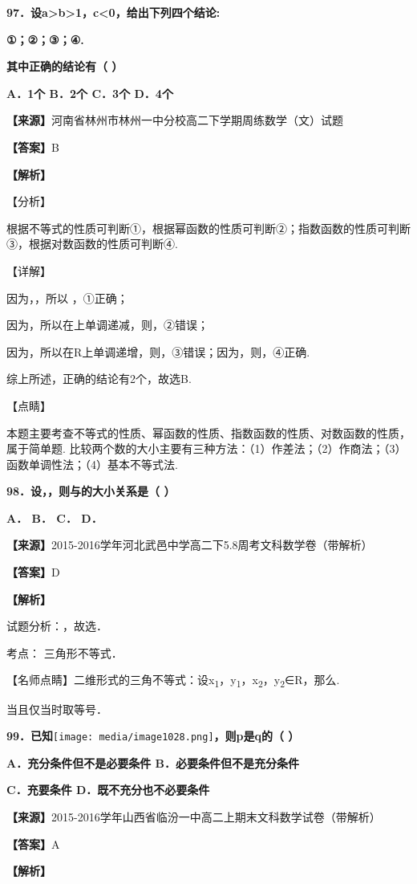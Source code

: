 \textbf{97．设a\textgreater b\textgreater1，c\textless0，给出下列四个结论:}

\textbf{①；②；③；④.}

\textbf{其中正确的结论有（ ）}

\textbf{A．1个 B．2个 C．3个 D．4个}

\textbf{【来源】}河南省林州市林州一中分校高二下学期周练数学（文）试题

\textbf{【答案】}B

\textbf{【解析】}

【分析】

根据不等式的性质可判断①，根据幂函数的性质可判断②；指数函数的性质可判断③，根据对数函数的性质可判断④.

【详解】

因为，，所以 ，①正确；

因为，所以在上单调递减，则，②错误；

因为，所以在R上单调递增，则，③错误；因为，则，④正确.

综上所述，正确的结论有2个，故选B.

【点睛】

本题主要考查不等式的性质、幂函数的性质、指数函数的性质、对数函数的性质，属于简单题.
比较两个数的大小主要有三种方法：（1）作差法；（2）作商法；（3）函数单调性法；（4）基本不等式法.

\textbf{98．设，，则与的大小关系是（ ）}

\textbf{A． B． C． D．}

\textbf{【来源】}2015-2016学年河北武邑中学高二下5.8周考文科数学卷（带解析）

\textbf{【答案】}D

\textbf{【解析】}

试题分析：，故选．

考点： 三角形不等式．

【名师点睛】二维形式的三角不等式：设x\textsubscript{1}，y\textsubscript{1}，x\textsubscript{2}，y\textsubscript{2}∈R，那么.

当且仅当时取等号．

\textbf{99．已知}\texttt{[image: media/image1028.png]}\textbf{，则p是q的（
）}

\textbf{A．充分条件但不是必要条件 B．必要条件但不是充分条件}

\textbf{C．充要条件 D．既不充分也不必要条件}

\textbf{【来源】}2015-2016学年山西省临汾一中高二上期末文科数学试卷（带解析）

\textbf{【答案】}A

\textbf{【解析】}

